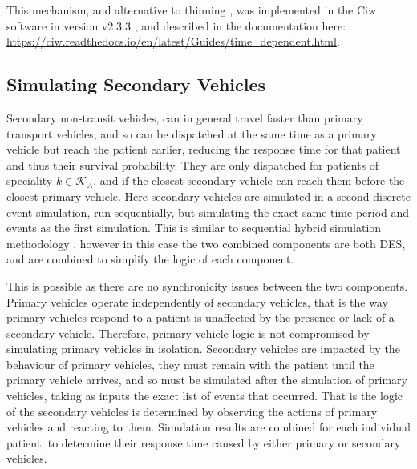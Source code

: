 \documentclass[preprint,12pt]{elsarticle}
\begin{document}
This mechanism, and alternative to thinning \cite{lewisshedler79}, was
implemented in the Ciw software in version v2.3.3 \cite{ciw233}, and described
in the documentation here:
\url{https://ciw.readthedocs.io/en/latest/Guides/time_dependent.html}.


\subsection{Simulating Secondary Vehicles}\label{sec:simulation_secondary}
Secondary non-transit vehicles, can in general travel faster than primary
transport vehicles, and so can be dispatched at the same time as a primary
vehicle but reach the patient earlier, reducing the response time for that
patient and thus their survival probability. They are only dispatched for
patients of speciality $k \in \mathcal{K}_A$, and if the closest secondary
vehicle can reach them before the closest primary vehicle.
Here secondary vehicles are simulated in a second discrete event simulation,
run sequentially, but simulating the exact same time period and events as the
first simulation. This is similar to sequential hybrid simulation methodology
\cite{brailsfordetal19, morganetal17}, however in this case the two combined
components are both DES, and are combined to simplify the logic of each
component.

This is possible as there are no synchronicity issues between the two
components. Primary vehicles operate independently of secondary vehicles, that
is the way primary vehicles respond to a patient is unaffected by the presence
or lack of a secondary vehicle.
Therefore, primary vehicle logic is not compromised by simulating primary
vehicles in isolation.
Secondary vehicles are impacted by the behaviour of primary vehicles, they
must remain with the patient until the primary vehicle arrives, and so must be
simulated after the simulation of primary vehicles, taking as inputs the exact
list of events that occurred. That is the logic of the secondary vehicles is
determined by observing the actions of primary vehicles and reacting to them.
Simulation results are combined for each individual patient, to determine
their response time caused by either primary or secondary vehicles.
\end{document}
